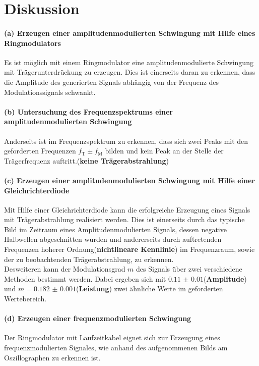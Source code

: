 \FloatBarrier
\section{Diskussion}
\label{sec:Diskussion}

\paragraph{(a) Erzeugen einer amplitudenmodulierten Schwingung mit
Hilfe eines Ringmodulators}
Es ist möglich mit einem Ringmodulator
eine amplitudenmodulierte Schwingung
mit Trägerunterdrückung zu erzeugen.
Dies ist einerseits daran zu erkennen,
dass die Amplitude des generierten Signals abhängig
von der Frequenz des Modulationssignals schwankt.

\paragraph{(b) Untersuchung des Frequenzspektrums einer
amplitudenmodulierten Schwingung}
Anderseits ist im Frequenzspektrum zu erkennen, dass sich zwei
Peaks mit den geforderten Frequenzen $f_{\text{T}}\pm f_{\text{M}}$
bilden
und kein Peak an der Stelle der Trägerfrequenz
auftritt.(\textbf{keine Trägerabstrahlung})

\paragraph{(c) Erzeugen einer amplitudenmodulierten Schwingung
mit Hilfe einer Gleichrichterdiode}
Mit Hilfe einer Gleichrichterdiode kann
die erfolgreiche Erzeugung eines Signals mit Trägerabstrahlung
realisiert werden.
Dies ist einerseits durch das typische Bild im Zeitraum eines
Amplitudenmodulierten Signals, dessen negative Halbwellen
abgeschnitten wurden
und andererseits durch auftretenden Frequenzen hoherer
Ordnung(\textbf{nichtlineare Kennlinie})
im Frequenzraum, sowie der zu beobachtenden
Trägerabstrahlung, zu erkennen. \\
Desweiteren kann der Modulationsgrad $m$ des Signals
über zwei verschiedene
Methoden bestimmt werden. Dabei ergeben sich mit
$\num{0.11(1)}$(\textbf{Amplitude}) und $m=\num{0.182(1)}$(\textbf{Leistung})
zwei ähnliche Werte
im geforderten Wertebereich.

\paragraph{(d) Erzeugen einer frequenzmodulierten Schwingung}
Der Ringmodulator mit Laufzeitkabel eignet sich zur Erzeugung
eines frequenzmodulierten Signales, wie anhand des aufgenommenen Bilds
am Oszillographen zu erkennen ist.

